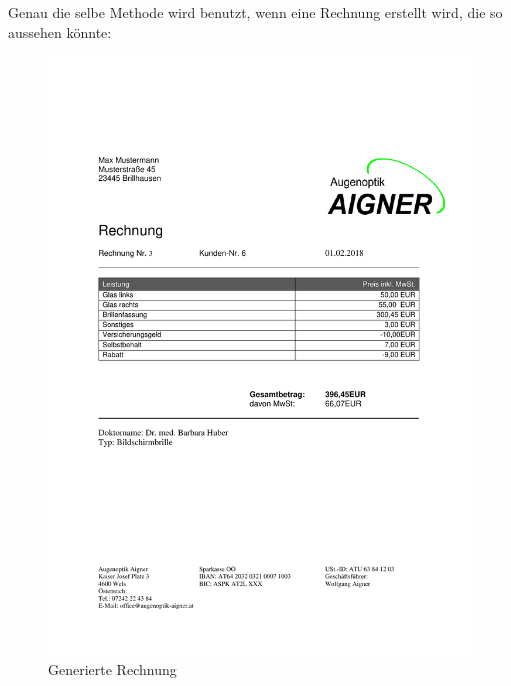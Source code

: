 Genau die selbe Methode wird benutzt, wenn eine Rechnung erstellt wird, die so aussehen könnte:
\begin{figure}[H]
\begin{center}
	\includegraphics[scale=.75]{images/Musterrechnung.pdf}
\end{center}
	\caption{Generierte Rechnung}
	\label{fig:sample}
\end{figure}
